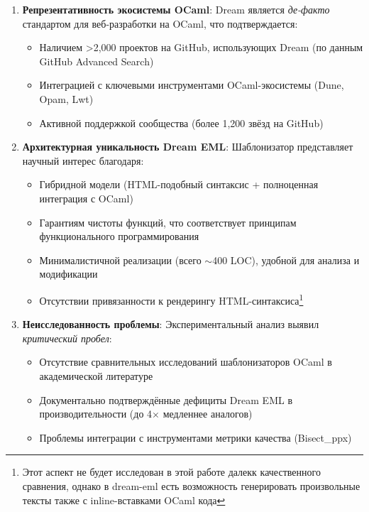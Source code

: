 \begin{enumerate}
    \item \textbf{Репрезентативность экосистемы OCaml}:
          Dream является \textit{де-факто} стандартом для веб-разработки на OCaml, что подтверждается:
          \begin{itemize}
              \item Наличием >2,000 проектов на GitHub, использующих Dream (по данным GitHub Advanced Search)
              \item Интеграцией с ключевыми инструментами OCaml-экосистемы (Dune, Opam, Lwt)
              \item Активной поддержкой сообщества (более 1,200 звёзд на GitHub)
          \end{itemize}

    \item \textbf{Архитектурная уникальность Dream EML}:
          Шаблонизатор представляет научный интерес благодаря:
          \begin{itemize}
              \item Гибридной модели (HTML-подобный синтаксис + полноценная интеграция с OCaml)
              \item Гарантиям чистоты функций, что соответствует принципам функционального программирования
              \item Минималистичной реализации (всего $\sim$400 LOC), удобной для анализа и модификации
              \item Отсутствии привязанности к рендерингу HTML-синтаксиса\footnote{Этот аспект не будет исследован в этой работе далекк качественного сравнения, однако в dream-eml есть возможность генерировать произвольные тексты также с inline-вставками OCaml кода}
          \end{itemize}

    \item \textbf{Неисследованность проблемы}:
          Экспериментальный анализ выявил \textit{критический пробел}:
          \begin{itemize}
              \item Отсутствие сравнительных исследований шаблонизаторов OCaml в академической литературе
              \item Документально подтверждённые дефициты Dream EML в производительности (до 4$\times$ медленнее аналогов)
              \item Проблемы интеграции с инструментами метрики качества (Bisect\_ppx)
          \end{itemize}


\end{enumerate}

